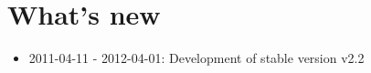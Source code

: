 \section{What's new}

\begin{itemize}
   \item{2011-04-11 - 2012-04-01: Development of stable version v2.2}
\end{itemize}
